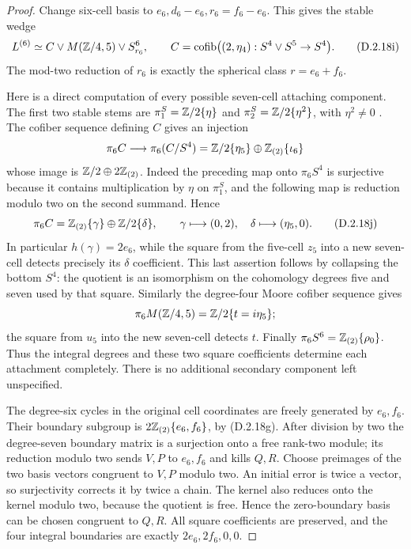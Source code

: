 \begin{proof}
Change six-cell basis to $e_6,d_6-e_6,r_6=f_6-e_6$.
This gives the stable wedge
\[
 L^{(6)}\simeq C\vee M(\mathbb Z/4,5)\vee S^6_{r_6},\qquad
 C=\operatorname{cofib}\bigl((2,\eta_4):S^4\vee S^5\to S^4\bigr).
 \tag{D.2.18i}
\]
The mod-two reduction of $r_6$ is exactly the spherical
class $r=e_6+f_6$.

Here is a direct computation of every possible seven-cell
attaching component. The first two stable stems are
$\pi_1^S=\mathbb Z/2\{\eta\}$ and
$\pi_2^S=\mathbb Z/2\{\eta^2\}$, with $\eta^2\ne0$
\cite[\S2, equation~(2.1), p.~149]{I_Oka1986}.
The cofiber sequence defining $C$ gives an injection
\[
 \pi_6C\longrightarrow
 \pi_6(C/S^4)=\mathbb Z/2\{\eta_5\}\oplus\mathbb Z_{(2)}\{\iota_6\}
\]
whose image is $\mathbb Z/2\oplus2\mathbb Z_{(2)}$.
Indeed the preceding map onto $\pi_6S^4$ is surjective
because it contains multiplication by $\eta$ on
$\pi_1^S$, and the following map is reduction modulo two
on the second summand. Hence
\[
 \pi_6C=\mathbb Z_{(2)}\{\gamma\}\oplus\mathbb Z/2\{\delta\},
 \qquad \gamma\longmapsto(0,2),\quad
 \delta\longmapsto(\eta_5,0).
 \tag{D.2.18j}
\]
In particular $h(\gamma)=2e_6$, while the square from
the five-cell $z_5$ into a new seven-cell detects precisely
its $\delta$ coefficient. This last assertion follows by
collapsing the bottom $S^4$: the quotient is an isomorphism
on the cohomology degrees five and seven used by that square.
Similarly the degree-four Moore cofiber sequence gives
\[
 \pi_6M(\mathbb Z/4,5)=\mathbb Z/2\{t=i\eta_5\};
\]
the square from $u_5$ into the new seven-cell detects $t$.
Finally $\pi_6S^6=\mathbb Z_{(2)}\{\rho_0\}$.
Thus the integral degrees and these two square coefficients
determine each attachment completely. There is no additional
secondary component left unspecified.

The degree-six cycles in the original cell coordinates are
freely generated by $e_6,f_6$. Their boundary subgroup is
$2\mathbb Z_{(2)}\{e_6,f_6\}$, by \textup{(D.2.18g)}.
After division by two the degree-seven boundary matrix is a
surjection onto a free rank-two module; its reduction modulo
two sends $V,P$ to $e_6,f_6$ and kills $Q,R$.
Choose preimages of the two basis vectors congruent to $V,P$
modulo two. An initial error is twice a vector, so surjectivity
corrects it by twice a chain. The kernel also reduces onto
the kernel modulo two, because the quotient is free. Hence
the zero-boundary basis can be chosen congruent to $Q,R$.
All square coefficients are preserved, and the four integral
boundaries are exactly $2e_6,2f_6,0,0$.


\end{proof}
